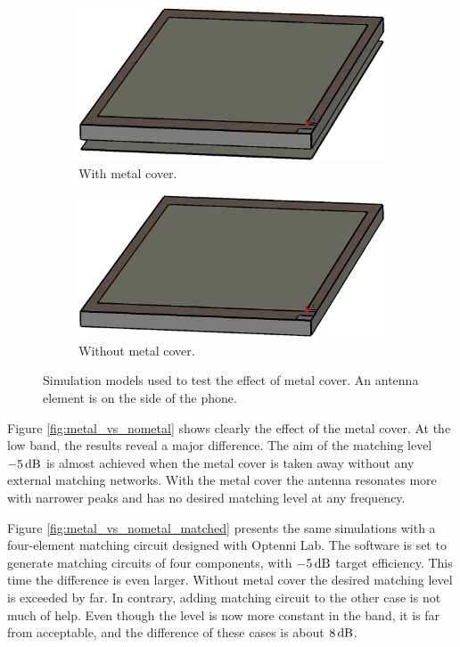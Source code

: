 \begin{figure}[H]
    \centering
    \begin{subfigure}[b]{0.49\textwidth}
    \includegraphics[width=\textwidth]{img/metal_cover.eps}
    \caption{With metal cover.}
    \label{fig:metal_cover}
    \end{subfigure}
    \begin{subfigure}[b]{0.49\textwidth}
    \includegraphics[width=\textwidth]{img/no_metal_cover.eps}
    \caption{Without metal cover.}
    \label{fig:nometal_cover}
    \end{subfigure}
    \caption{Simulation models used to test the effect of metal cover. An antenna element is on the side of the phone.}
    \label{fig:metal_vs_nometal_model}
\end{figure}

Figure \ref{fig:metal_vs_nometal} shows clearly the effect of the metal cover. At the low band, the results reveal a major difference. The aim of the matching level $-5\,\mathrm{dB}$ is almost achieved when the metal cover is taken away without any external matching networks. With the metal cover the antenna resonates more with narrower peaks and has no desired matching level at any frequency. 

Figure \ref{fig:metal_vs_nometal_matched} presents the same simulations with a four-element matching circuit designed with Optenni Lab. The software is set to generate matching circuits of four components, with $-5\,\mathrm{dB}$ target efficiency. This time the difference is even larger. Without metal cover the desired matching level is exceeded by far. In contrary, adding matching circuit to the other case is not much of help. Even though the level is now more constant in the band, it is far from acceptable, and the difference of these cases is about $8\,\mathrm{dB}$.

